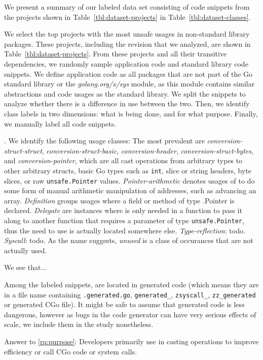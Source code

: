 We present a summary of our labeled data set consisting of  code snippets from the  projects shown in Table~\ref{tbl:dataset-projects} in Table~\ref{tbl:dataset-classes}.



We select the top  projects with the most unsafe usages in non-standard library packages.
These projects, including the revision that we analyzed, are shown in Table~\ref{tbl:dataset-projects}.
From these projects and all their transitive dependencies, we randomly sample  application code and  standard library code snippets. We define application code as all packages that are not part of the Go standard library or the \textit{golang.org/x/sys} module, as this module contains similar abstractions and code usages as the standard library. We split the snippets to analyze whether there is a difference in use between the two.
Then, we identify class labels in two dimensions: what is being done, and for what purpose. Finally, we manually label all  code snippets.



.
We identify the following usage classes:
The most prevalent are \textit{conversion-struct-struct}, \textit{conversion-struct-basic}, \textit{conversion-header}, \textit{conversion-struct-bytes}, and \textit{conversion-pointer}, which are all cast operations from arbitrary types to other arbitrary structs, basic Go types such as \texttt{int}, slice or string headers, byte slices, or raw \texttt{unsafe.Pointer} values.
\textit{Pointer-arithmetic} denotes usages of \unsafe{} to do some form of manual arithmetic manipulation of addresses, such as advancing an array.
\textit{Definition} groups usages where a field or method of type \unsafe.Pointer{} is declared.
\textit{Delegate} are instances where \unsafe{} is only needed in a function to pass it along to another function that requires a parameter of type \texttt{unsafe.Pointer}, thus the need to use \unsafe{} is actually located somewhere else.
\textit{Type-reflection}: todo.
\textit{Syscall}: todo.
As the name suggests, \textit{unused} is a class of occurances that are not actually used.

We see that...

Among the  labeled snippets,  are located in generated code (which means they are in a file name containing \texttt{.generated.go}, \texttt{generated\_}, \texttt{zsyscall\_}, \texttt{zz\_generated} or generated CGo file).
It might be safe to assume that generated code is less dangerous, however as bugs in the code generator can have very serious effects of scale, we include them in the study nonetheless.

\begin{tcolorbox}
Answer to \ref{rq:purpose}: Developers primarily use \unsafe{} in casting operations to improve efficiency or call CGo code or system calls.
\end{tcolorbox}
